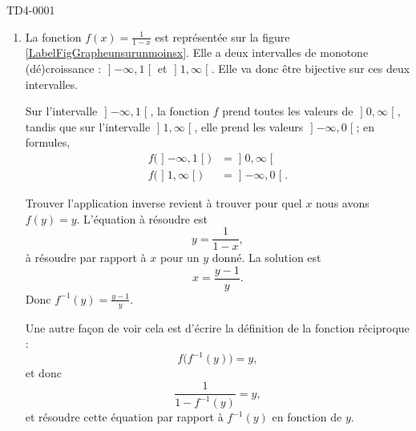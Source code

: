 
\begin{corrige}{TD4-0001}

	\begin{enumerate}
		\item
			\newcommand{\CaptionFigGrapheunsurunmoinsx}{Le graphe de la fonction $x\mapsto\frac{1}{ 1-x }$.}
			
			La fonction $f(x)=\frac{1}{ 1-x }$ est représentée sur la figure \ref{LabelFigGrapheunsurunmoinsx}. Elle a deux intervalles de monotone (dé)croissance : $\mathopen] -\infty , 1 \mathclose[$ et $\mathopen] 1 , \infty \mathclose[$. Elle va donc être bijective sur ces deux intervalles.

			Sur l'intervalle $\mathopen] -\infty , 1 \mathclose[$, la fonction $f$ prend toutes les valeurs de $\mathopen] 0 , \infty \mathclose[$, tandis que sur l'intervalle $\mathopen] 1 , \infty \mathclose[$, elle prend les valeurs $\mathopen] -\infty , 0 \mathclose[$; en formules,
			\begin{subequations}
				\begin{align}
					f\big( \mathopen] -\infty , 1 \mathclose[ \big)&=\mathopen] 0 , \infty \mathclose[\\
					f\big( \mathopen] 1 , \infty \mathclose[ \big)&=\mathopen] -\infty , 0 \mathclose[.
				\end{align}
			\end{subequations}

			Trouver l'application inverse revient à trouver pour quel $x$ nous avons $f(y)=y$. L'équation à résoudre est
			\begin{equation}
				y=\frac{1}{ 1-x },
			\end{equation}
			à résoudre par rapport à $x$ pour un $y$ donné. La solution est
			\begin{equation}
				x=\frac{ y-1 }{ y }.
			\end{equation}
			Donc $f^{-1}(y)=\frac{ y-1 }{ y }$.

			Une autre façon de voir cela est d'écrire la définition de la fonction réciproque :
			\begin{equation}
				f\big( f^{-1}(y) \big)=y,
			\end{equation}
			et donc
			\begin{equation}
				\frac{1}{ 1-f^{-1}(y) }=y,
			\end{equation}
			et résoudre cette équation par rapport à $f^{-1}(y)$ en fonction de $y$.


\end{enumerate}
\end{corrige}
